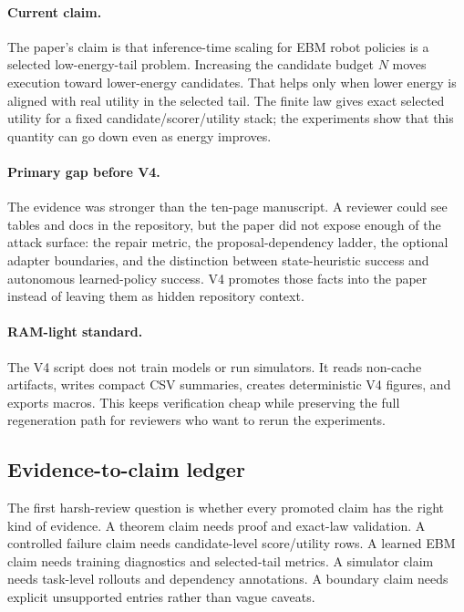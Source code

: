 \paragraph{Current claim.}
The paper's claim is that inference-time scaling for EBM robot policies is a
selected low-energy-tail problem. Increasing the candidate budget \(N\) moves
execution toward lower-energy candidates. That helps only when lower energy is
aligned with real utility in the selected tail. The finite law gives exact
selected utility for a fixed candidate/scorer/utility stack; the experiments
show that this quantity can go down even as energy improves.

\paragraph{Primary gap before V4.}
The evidence was stronger than the ten-page manuscript. A reviewer could see
tables and docs in the repository, but the paper did not expose enough of the
attack surface: the repair metric, the proposal-dependency ladder, the
optional adapter boundaries, and the distinction between state-heuristic
success and autonomous learned-policy success. V4 promotes those facts into
the paper instead of leaving them as hidden repository context.

\paragraph{RAM-light standard.}
The V4 script does not train models or run simulators. It reads
\VFourEBMArtifactFiles{} non-cache artifacts, writes compact CSV summaries,
creates \VFourEBMVFourFigures{} deterministic V4 figures, and exports
macros. This keeps verification cheap while preserving the full regeneration
path for reviewers who want to rerun the experiments.

\subsection{Evidence-to-claim ledger}
\label{app:V4-evidence-ledger}

The first harsh-review question is whether every promoted claim has the right
kind of evidence. A theorem claim needs proof and exact-law validation. A
controlled failure claim needs candidate-level score/utility rows. A learned
EBM claim needs training diagnostics and selected-tail metrics. A simulator
claim needs task-level rollouts and dependency annotations. A boundary claim
needs explicit unsupported entries rather than vague caveats.

